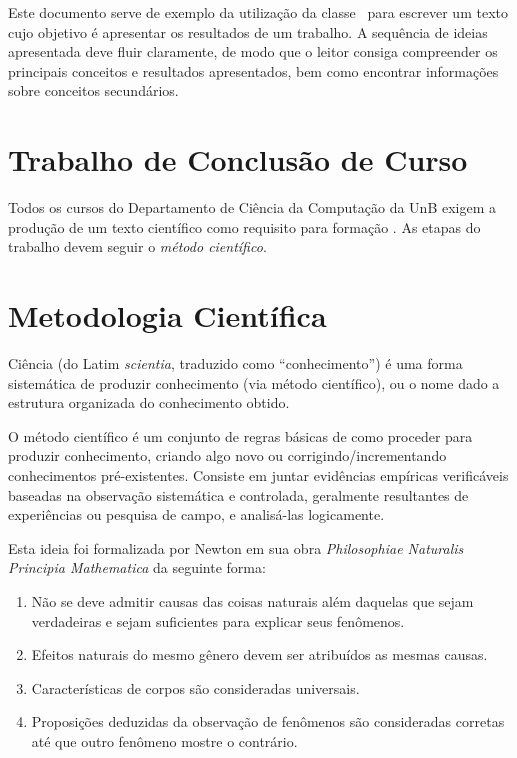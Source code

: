 Este documento serve de exemplo da utilização da classe \unbcic\ para escrever 
um texto cujo objetivo é apresentar os resultados de um trabalho. A sequência de 
ideias apresentada deve fluir claramente, de modo que o leitor consiga compreender 
os principais conceitos e resultados apresentados, bem como encontrar informações 
sobre conceitos secundários.


\section{Trabalho de Conclusão de Curso}%
Todos os cursos do Departamento de Ciência da Computação da UnB exigem a produção de um
texto científico como requisito para formação %
. 
As etapas do trabalho devem seguir o \emph{método científico}.

\section{Metodologia Científica}%
Ciência (do Latim \emph{scientia}, traduzido como ``conhecimento'') é uma forma 
sistemática de produzir conhecimento (via método científico), ou o nome dado a 
estrutura organizada do conhecimento obtido.

O método científico é um conjunto de regras básicas de como proceder para produzir 
conhecimento, criando algo novo ou corrigindo/incrementando conhecimentos 
pré-existentes. Consiste em juntar evidências empíricas verificáveis baseadas na 
observação sistemática e controlada, geralmente resultantes de experiências ou 
pesquisa de campo, e analisá-las logicamente. 

Esta ideia foi formalizada por Newton em sua obra \emph{Philosophiae Naturalis 
Principia Mathematica} \cite{newton1833philosophiae} da seguinte forma:
\begin{enumerate}
	\item Não se deve admitir causas das coisas naturais além daquelas 
	que sejam verdadeiras e sejam suficientes para explicar seus fenômenos.
	\item Efeitos naturais do mesmo gênero devem ser atribuídos as mesmas causas.
	\item Características de corpos são consideradas universais.
	\item Proposições deduzidas da observação de fenômenos são 
	consideradas corretas até que outro fenômeno mostre o contrário.
\end{enumerate}%

